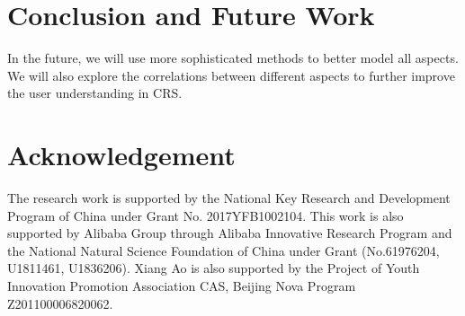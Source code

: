 \documentclass[sigconf,natbib=true]{acmart}
\begin{document}
\section{Conclusion and Future Work}


In the future, we will use more sophisticated methods to better model all aspects. We will also explore the correlations between different aspects to further improve the user understanding in CRS.

\section*{Acknowledgement}
The research work is supported by the National Key Research and Development Program of China under Grant No. 2017YFB1002104. This work is also supported by Alibaba Group through Alibaba Innovative
Research Program and the National Natural Science Foundation of China under Grant (No.61976204, U1811461, U1836206). Xiang Ao is also supported by the Project of Youth Innovation Promotion Association CAS, Beijing Nova Program Z201100006820062.


























\end{document}
